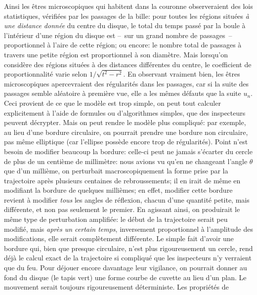 \medskip 
Ainsi les \^etres microscopiques qui habitent dans la couronne 
observeraient des lois statistiques, v\'erifi\'ees par les passages de la 
bille: pour toutes les r\'egions  situ\'ees {\it \`a une distance donn\'ee}  
du centre du disque, le total du temps pass\'e par la boule \`a l'int\'erieur 
d'une r\'egion du disque est --~sur un grand nombre de passages~-- 
proportionnel \`a l'aire de cette r\'egion; ou encore: le nombre total de 
passages \`a travers une petite r\'egion est proportionnel \`a son 
diam\`etre. Mais lorsqu'on consid\`ere des r\'egions situ\'ees \`a des  
distances diff\'erentes du centre, le coefficient de proportionnalit\'e 
varie selon $1 /\sqrt{t^2 - r^2}$.  
\medskip 
En observant vraiment bien, les \^etres microscopiques apercevraient  
des r\'egularit\'es dans les passages, car si la suite des  
passages semble al\'eatoire \`a premi\`ere vue, elle a les m\^emes 
d\'efauts que la suite $u_n$. Ceci provient de ce que le mod\`ele 
est trop simple, on peut tout calculer explicitement \`a l'aide de 
formules ou d'algorithmes simples, que des inspecteurs peuvent 
d\'ecrypter. Mais on peut rendre le mod\`ele plus compliqu\'e: par 
exemple, au lieu d'une bordure circulaire, on pourrait prendre une 
bordure non circulaire, pas m\^eme elliptique (car l'ellipse poss\`ede 
encore trop de r\'egularit\'es). Point n'est besoin de modifier beaucoup 
la bordure: celle-ci peut ne jamais s'\'ecarter du  cercle de plus de un 
centi\`eme de millim\`etre: nous avions vu qu'en ne changeant 
l'angle $\theta$ que d'un milli\`eme, on perturbait macroscopiquement 
la forme prise par la trajectoire apr\`es plusieurs centaines de 
rebroussements; il en irait de m\^eme en modifiant la bordure de 
quelques milli\`emes; en effet, modifier cette bordure revient \`a 
modifier {\it tous} les angles de r\'eflexion, chacun d'une quantit\'e  
petite, mais diff\'erente, et non pas seulement le premier. En agissant 
ainsi, on produirait le m\^eme type de perturbation amplifi\'ee: le  
d\'ebut de la trajectoire serait peu modifi\'e, mais  {\it apr\`es un 
certain temps}, inversement proportionnel  \`a l'amplitude des 
modifications, elle serait compl\`etement diff\'erente. Le simple fait 
d'avoir une bordure qui, bien que presque circulaire, n'est plus 
rigoureusement un cercle, rend d\'ej\`a le calcul exact de la trajectoire 
si compliqu\'e que les inspecteurs n'y verraient que du feu. Pour d\'ejouer 
encore davantage leur vigilance, on pourrait donner au fond du disque (le 
tapis vert) une forme courbe de cuvette au lieu d'un plan. Le mouvement 
serait toujours rigoureusement d\'eterministe. Les propri\'et\'es de 
